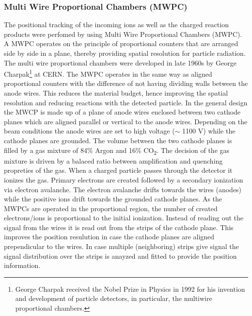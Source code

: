 \subsubsection{Multi Wire Proportional Chambers (MWPC)}\label{sec_mwpcs}
The positional tracking of the incoming ions as well as the charged reaction products were perfomed by using Multi Wire Proportional Chambers (MWPC). A MWPC operates on the principle of proportional counters that are arranged side by side in a plane, thereby providing spatial resolution for particle radiation. The multi wire proportional chambers were developed in late 1960s by George Charpak\footnote{George Charpak received the Nobel Prize in Physics in 1992 for his invention and development of particle detectors, in particular, the multiwire proportional chambers.} at CERN\cite{charpak1968use}.\newline
The MWPC operates in the same way as aligned proportional counters with the difference of not having dividing walls between the anode wires. This reduces the material budget, hence improving the spatial resolution and reducing reactions with the detected particle.\newline
In the general design the  MWCP is made up of a plane of anode wires enclosed between two cathode planes which are aligned parallel or vertical to the anode wires. Depending on the beam conditions the anode wires are set to high voltage ($\sim$ 1100 V) while the cathode planes are grounded.\newline
The volume between the two cathode planes is filled by a gas mixture of 84\% Argon and 16\% CO\textsubscript{2}. The decision of the gas mixture is driven by a balaced ratio between amplification and quenching propreties of the gas.\newline
When a charged particle passes through the detector it ionizes the gas. Primary electrons are created followed by a secondary ionization via electron avalanche. The electron avalanche drifts towards the wires (anodes) while the positive ions drift towards the grounded cathode planes. As the MWPCs are operated in the proportional region, the number of created electrons/ions is proportional to the initial ionization. Instead of reading out the signal from the wires it is read out from the strips of the cathode plane. This improves the position resulution in case the cathode planes are aligned prependicular to the wires. In case multiple (neighboring) strips give signal the signal distribution over the strips is anayzed and fitted to provide the position information.\newline
